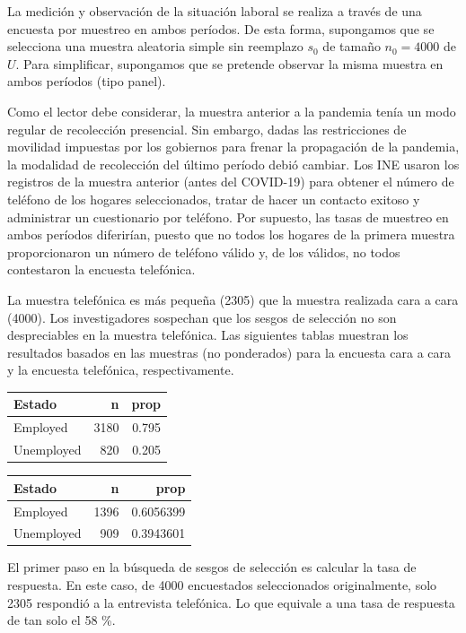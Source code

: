 \documentclass[
  12pt,
]{book}
\begin{document}
La medición y observación de la situación laboral se realiza a través de una encuesta por muestreo en ambos períodos. De esta forma, supongamos que se selecciona una muestra aleatoria simple sin reemplazo \(s_0\) de tamaño \(n_0 = 4000\) de \(U\). Para simplificar, supongamos que se pretende observar la misma muestra en ambos períodos (tipo panel).

Como el lector debe considerar, la muestra anterior a la pandemia tenía un modo regular de recolección presencial. Sin embargo, dadas las restricciones de movilidad impuestas por los gobiernos para frenar la propagación de la pandemia, la modalidad de recolección del último período debió cambiar. Los INE usaron los registros de la muestra anterior (antes del COVID-19) para obtener el número de teléfono de los hogares seleccionados, tratar de hacer un contacto exitoso y administrar un cuestionario por teléfono. Por supuesto, las tasas de muestreo en ambos períodos diferirían, puesto que no todos los hogares de la primera muestra proporcionaron un número de teléfono válido y, de los válidos, no todos contestaron la encuesta telefónica.

La muestra telefónica es más pequeña (2305) que la muestra realizada cara a cara (4000). Los investigadores sospechan que los sesgos de selección no son despreciables en la muestra telefónica. Las siguientes tablas muestran los resultados basados en las muestras (no ponderados) para la encuesta cara a cara y la encuesta telefónica, respectivamente.

\begin{longtable}{lrr}
\toprule
Estado & n & prop \\ 
\midrule
Employed & 3180 & 0.795 \\ 
Unemployed & 820 & 0.205 \\ 
\bottomrule
\end{longtable}
\begin{longtable}{lrr}
\toprule
Estado & n & prop \\ 
\midrule
Employed & 1396 & 0.6056399 \\ 
Unemployed & 909 & 0.3943601 \\ 
\bottomrule
\end{longtable}

El primer paso en la búsqueda de sesgos de selección es calcular la tasa de respuesta. En este caso, de 4000 encuestados seleccionados originalmente, solo 2305 respondió a la entrevista telefónica. Lo que equivale a una tasa de respuesta de tan solo el 58 \%.
\end{document}
